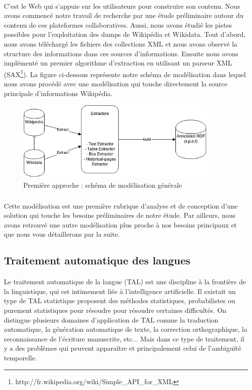 \paragraph{}
C'est le Web qui s'appuie sur les utilisateurs pour construire son contenu. Nous avons commencé notre travail de recherche par une étude préliminaire autour du contenu de ces plateformes collaboratives. Aussi, nous avons étudié les pistes possibles pour l'exploitation des dumps de Wikipédia et Wikidata. Tout d'abord, nous avons téléchargé les fichiers des collections XML et nous avons observé la structure des informations dans ces sources d'informations. Ensuite nous avons implémenté un premier algorithme d'extraction en utilisant un parseur XML (SAX\footnote{http://fr.wikipedia.org/wiki/Simple\_API\_for\_XML}).
La figure ci-dessous représente notre schéma de modélisation dans lequel nous avons procédé avec une modélisation qui touche directement la source principale d'informations Wikipédia.
\begin{figure}[H]
        \centering
                \centering
                \includegraphics[width=10cm]{modelisation.png}
               \caption{Première approche : schéma de modélisation générale}

\end{figure}
\subparagraph{}
Cette modélisation est une première rubrique d'analyse et de conception d'une solution qui touche les besoins préliminaires de notre étude. Par ailleurs, nous avons retrouvé une autre modélisation plus proche à nos besoins principaux et que nous vous détaillerons par la suite.
\subsection{Traitement automatique des langues}
\paragraph{}
Le traitement automatique de la langue (TAL) est une discipline à la frontière de la linguistique, qui est intimement liée à l'intelligence artificielle.
Il existait un type de TAL statistique proposent des méthodes statistiques, probabilistes ou purement statistiques pour résoudre pour résoudre certaines difficultés.
On distingue plusieurs domaines d'application de TAL comme la traduction automatique, la génération automatique de texte, la correction orthographique, la reconnaissance de l'écriture manuscrite, etc...
Mais dans ce type de traitement, il y a des problèmes qui peuvent apparaître et principalement celui de l'ambiguïté temporelle.

